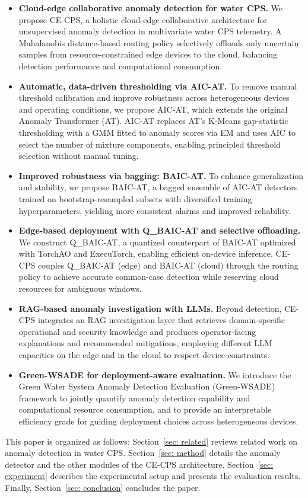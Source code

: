 \documentclass[pdflatex,sn-mathphys-num]{sn-jnl}%
\theoremstyle{thmstyleone}
\theoremstyle{thmstyletwo}%
\theoremstyle{thmstylethree}%
\begin{document}
\begin{itemize}
    \item \textbf{Cloud-edge collaborative anomaly detection for water CPS.}
    We propose CE-CPS, a holistic cloud-edge collaborative architecture for unsupervised anomaly detection in multivariate water CPS telemetry. A Mahalanobis distance-based routing policy selectively offloads only uncertain samples from resource-constrained edge devices to the cloud, balancing detection performance and computational consumption.
    \item  \textbf{Automatic, data-driven thresholding via AIC-AT.}
    To remove manual threshold calibration and improve robustness across heterogeneous devices and operating conditions, we propose AIC-AT, which extends the original Anomaly Transformer (AT). AIC-AT replaces AT's K-Means gap-statistic thresholding with a GMM fitted to anomaly scores via EM and uses AIC to select the number of mixture components, enabling principled threshold selection without manual tuning.
    \item \textbf{Improved robustness via bagging: BAIC-AT.}
    To enhance generalization and stability, we propose BAIC-AT, a bagged ensemble of AIC-AT detectors trained on bootstrap-resampled subsets with diversified training hyperparameters, yielding more consistent alarms and improved reliability.
    \item \textbf{Edge-based deployment with Q\_BAIC-AT and selective offloading.}
    We construct Q\_BAIC-AT, a quantized counterpart of BAIC-AT optimized with TorchAO and ExecuTorch, enabling efficient on-device inference. CE-CPS couples Q\_BAIC-AT (edge) and BAIC-AT (cloud) through the routing policy to achieve accurate common-case detection while reserving cloud resources for ambiguous windows.
    \item \textbf{RAG-based anomaly investigation with LLMs.}
    Beyond detection, CE-CPS integrates an RAG investigation layer that retrieves domain-specific operational and security knowledge and produces operator-facing explanations and recommended mitigations, employing different LLM capacities on the edge and in the cloud to respect device constraints.
    \item \textbf{Green-WSADE for deployment-aware evaluation.}
    We introduce the Green Water System Anomaly Detection Evaluation (Green-WSADE) framework to jointly quantify anomaly detection capability and computational resource consumption, and to provide an interpretable efficiency grade for guiding deployment choices across heterogeneous devices.
    
\end{itemize}
This paper is organized as follows: Section~\ref{sec: related} reviews related work on anomaly detection in water CPS.
Section~\ref{sec: method} details the anomaly detector and the other modules of the CE-CPS architecture.
Section~\ref{sec: experiment} describes the experimental setup and presents the evaluation results.
Finally, Section~\ref{sec: conclusion} concludes the paper.
\end{document}
